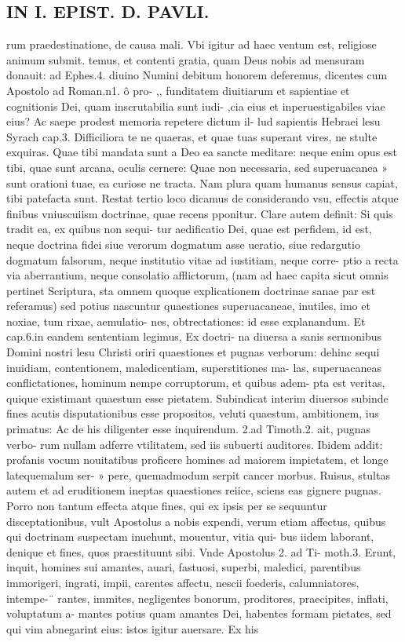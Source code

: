 \documentclass{article}
\begin{document}
\begin{pages}
\section*{IN I. EPIST. D. PAVLI. }
\marginpar{[ p.19 ]}\pstart rum praedestinatione, de causa mali. Vbi igitur ad haec ventum est, religiose animum submit. temus, et contenti gratia, quam Deus nobis ad mensuram donauit: ad Ephes.4. diuino Numini debitum honorem deferemus, dicentes cum Apostolo ad Roman.n1. ô pro- ,, funditatem diuitiarum et sapientiae et cognitionis Dei, quam inscrutabilia sunt iudi- ,cia eius et inperuestigabiles viae eius? Ac saepe prodest memoria repetere dictum il-   lud sapientis Hebraei lesu Syrach cap.3. Difficiliora te ne quaeras, et quae tuas superant   vires, ne stulte exquiras. Quae tibi mandata sunt a Deo ea sancte meditare: neque  enim   opus est tibi, quae sunt arcana, oculis cernere: Quae non necessaria, sed superuacanea » sunt orationi tuae, ea curiose ne tracta. Nam plura quam humanus sensus capiat, tibi   patefacta sunt.  \pend\pstart Restat tertio loco dicamus de considerando vsu, effectis atque  finibus vniuscuiism doctrinae, quae recens pponitur. Clare autem definit: Si quis tradit ea, ex quibus non sequi- tur aedificatio Dei, quae est perfidem, id est, neque  doctrina fidei siue verorum dogmatum asse ueratio, siue redargutio dogmatum falsorum, neque  institutio vitae ad iustitiam, neque  corre- ptio a recta via aberrantium, neque  consolatio afflictorum, (nam ad haec capita sicut omnis pertinet Scriptura, sta omnem quoque  explicationem doctrinae sanae par est referamus) sed potius nascuntur quaestiones superuacaneae, inutiles, imo et noxiae, tum rixae, aemulatio- nes, obtrectationes: id esse explanandum. Et cap.6.in eandem sententiam legimus, Ex doctri- na diuersa a sanis sermonibus Domini nostri lesu Christi oriri quaestiones et pugnas verborum: dehinc sequi inuidiam, contentionem, maledicentiam, superstitiones ma- las, superuacaneas conflictationes, hominum nempe corruptorum, et quibus adem- pta est veritas, quique  existimant quaestum esse pietatem. Subindicat interim diuersos subinde fines acutis disputationibus esse propositos, veluti quaestum, ambitionem, ius primatus: Ac de his diligenter esse inquirendum. 2.ad Timoth.2. ait, pugnas verbo- rum nullam adferre vtilitatem, sed iis subuerti auditores. Ibidem addit: profanis vocum nouitatibus proficere homines ad maiorem impietatem, et longe latequemalum ser- » pere, quemadmodum serpit cancer morbus. Ruisus, stultas autem et ad eruditionem ineptas quaestiones reiice, sciens eas gignere pugnas. Porro non tantum effecta atque  fines, qui ex ipsis per se sequuntur disceptationibus, vult Apostolus a nobis expendi, verum etiam affectus, quibus qui doctrinam suspectam inuehunt, mouentur, vitia qui- bus iidem laborant, denique  et fines, quos praestituunt sibi. Vnde Apostolus 2. ad Ti-   moth.3. Erunt, inquit, homines sui amantes, auari, fastuosi, superbi, maledici, parentibus   immorigeri, ingrati, impii, carentes affectu, nescii foederis, calumniatores, intempe-¨   rantes, immites, negligentes bonorum, proditores, praecipites, inflati, voluptatum a-   mantes potius quam amantes Dei, habentes formam pietates, sed qui vim abnegarint   eius: istos igitur auersare. Ex his 
\end{pages}
\end{document}
